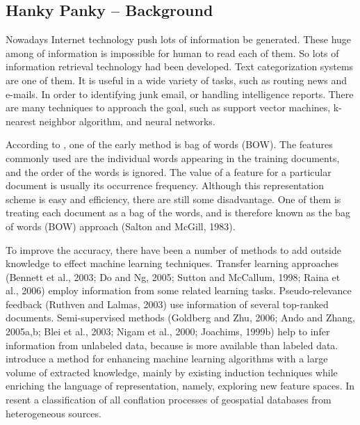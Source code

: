 \documentclass[a4paper]{article} %
\begin{document}
	\subsection*{Hanky Panky -- Background}
	\label{task1}
	
	Nowadays Internet technology push lots of information be generated. These huge among of information is impossible for human to read each of them. So lots of information retrieval technology had been developed. Text categorization systems are one of them. It is useful in a wide variety of tasks, such as routing news and e-mails. In order to identifying junk email, or handling intelligence reports. There are many techniques to approach the goal, such as support vector machines, k-nearest neighbor algorithm, and neural networks.
	
	According to \cite{Gabrilovich:2007:HEH:1314498.1314573}, one of the early method is bag of words (BOW). The features commonly used are the individual words appearing in the training documents, and the order of the words is ignored. The value of a feature for a particular document is usually its occurrence frequency. Although this representation scheme is easy and efficiency,  there are still some disadvantage. One of them is treating each document as a bag of the words, and is therefore known as the bag of words (BOW) approach (Salton and McGill, 1983).
	
	To improve the accuracy, there have been a number of methods to add outside knowledge to effect machine learning techniques. Transfer learning approaches (Bennett et al., 2003; Do and Ng, 2005; Sutton and McCallum, 1998; Raina et al., 2006) employ information from some related learning tasks. Pseudo-relevance feedback (Ruthven and Lalmas, 2003) use information of several top-ranked documents. Semi-supervised methods (Goldberg and Zhu, 2006; Ando and Zhang, 2005a,b; Blei et al., 2003; Nigam et al., 2000; Joachims, 1999b) help to infer information from unlabeled data, because is more available than labeled data. \cite{Gabrilovich:2007:HEH:1314498.1314573} introduce a method for enhancing machine learning algorithms with a large volume of extracted knowledge, mainly by existing induction techniques while enriching the language of representation, namely, exploring new feature spaces. In \cite{ISI:000295620300006} resent a classification of all conflation processes of geospatial databases from heterogeneous sources.
	\clearpage
	
	
\end{document}

